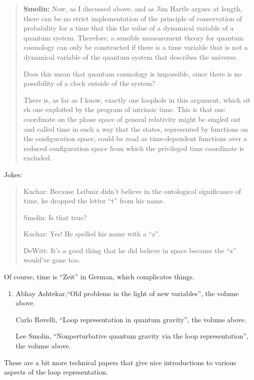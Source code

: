 \documentclass{article}
\begin{document}
\begin{quote}
\textbf{Smolin:} Now, as I discussed above, and as Jim Hartle argues at
length, there can be no strict implementation of the principle of
conservation of probability for a time that this the value of a
dynamical variable of a quantum system. Therefore, a sensible
measurement theory for quantum cosmology can only be constructed if
there is a time variable that is not a dynamical variable of the quantum
system that describes the universe.

Does this mean that quantum cosmology is impossible, since there is no
possibility of a clock outside of the system?

There is, as far as I know, exactly one loophole in this argument, which
sit eh one exploited by the program of intrinsic time. This is that one
coordinate on the phase space of general relativity might be singled out
and called time in such a way that the states, represented by functions
on the configuration space, could be read as time-dependent functions
over a reduced configuration space from which the privileged time
coordinate is excluded.
\end{quote}

\noindent Jokes:

\begin{quote}
Kuchar: Because Leibniz didn't believe in the ontological significance
of time, he dropped the letter ``t'' from his name.

Smolin: Is that true?

Kuchar: Yes! He spelled his name with a ``z''.

DeWitt: It's a good thing that he did believe in space because the ``z''
would've gone too.
\end{quote}
Of course, time is ``Zeit'' in German, which complicates things. 

\begin{enumerate}
\def\labelenumi{\arabic{enumi})}
\setcounter{enumi}{3}
\item
  Abhay Ashtekar,``Old problems in the light of new variables'', the
  volume above.

  Carlo Rovelli, ``Loop representation in quantum gravity'', the
  volume above.

  Lee Smolin, ``Nonperturbative quantum gravity via the loop representation'',  the volume above.
\end{enumerate}

\noindent
These are a bit more technical papers that give nice introductions to
various aspects of the loop representation.
\end{document}
